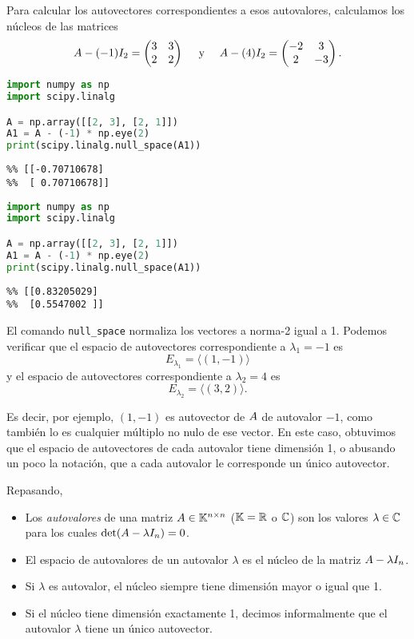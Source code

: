 Para calcular los autovectores correspondientes a esos autovalores,
calculamos los núcleos de las matrices $$
\Ab - (-1) \Ib_2 = \begin{pmatrix} 3 & 3 \\ 2 & 2 \end{pmatrix} \quad \text{ y } \quad \Ab - (4) \Ib_2 = \begin{pmatrix} -2 & 3 \\ 2 & -3 \end{pmatrix}.
$$

\begin{Shaded}
\begin{lstlisting}[language=python]
import numpy as np
import scipy.linalg

A = np.array([[2, 3], [2, 1]])
A1 = A - (-1) * np.eye(2)
print(scipy.linalg.null_space(A1))
\end{lstlisting}
\end{Shaded}

\begin{verbatim}
%% [[-0.70710678]
%%  [ 0.70710678]]
\end{verbatim}

\begin{Shaded}
\begin{lstlisting}[language=python]
import numpy as np
import scipy.linalg

A = np.array([[2, 3], [2, 1]])
A1 = A - (-1) * np.eye(2)
print(scipy.linalg.null_space(A1))
\end{lstlisting}
\end{Shaded}

\begin{verbatim}
%% [[0.83205029]
%%  [0.5547002 ]]
\end{verbatim}

El comando \texttt{null\_space} normaliza los vectores a norma-2 igual a 1. Podemos verificar que el espacio de autovectores correspondiente a
$\lambda_1 = -1$ es $$E_{\lambda_1} = \langle (1, -1)\rangle$$ y el
espacio de autovectores correspondiente a $\lambda_2 = 4$ es
$$E_{\lambda_2} = \langle (3, 2)\rangle.$$

Es decir, por ejemplo, $(1, -1)$ es autovector de $\Ab$ de autovalor $-1$,
como también lo es cualquier múltiplo no nulo de ese vector. En este
caso, obtuvimos que el espacio de autovectores de cada autovalor tiene
dimensión 1, o abusando un poco la notación, que a cada autovalor le
corresponde un único autovector.

Repasando,
\begin{itemize}
\item   Los \emph{autovalores} de una matriz $\Ab \in \K^{n \times n}$ ($\mathbb K = \mathbb R$ o $\mathbb C$) son los
    valores $\lambda \in \mathbb C$ para los cuales
    $\det(\Ab - \lambda \Ib_n) = 0$.
\item   El espacio de autovalores de un autovalor $\lambda$ es el núcleo de
    la matriz $\Ab - \lambda \Ib_n$.
\item   Si $\lambda$ es autovalor, el núcleo siempre tiene dimensión mayor o
    igual que 1.
\item   Si el núcleo tiene dimensión exactamente 1, decimos informalmente
    que el autovalor $\lambda$ tiene un único autovector.
\end{itemize}

